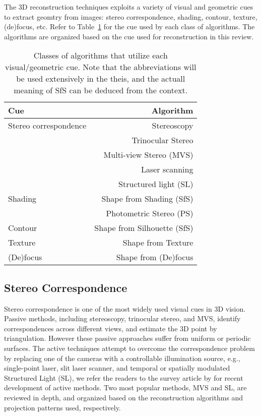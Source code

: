 The 3D reconstruction techniques exploits a variety of visual and geometric cues to extract geomtry from images: stereo correspondence, shading, contour, texture, (de)focus, etc. Refer to Table~\ref{tab:cue_algo} for the cue used by each class of algorithms. The algorithms are organized based on the cue used for reconstruction in this review.
\begin{table}[h]
  \centering
  \begin{tabular}{l|r}
  \hline
  \textbf{Cue} & \textbf{Algorithm}\\
  \hline\hline
  Stereo correspondence & Stereoscopy\\
  & Trinocular Stereo\\
  & Multi-view Stereo (MVS)\\
  & Laser scanning\\
  & Structured light (SL)\\
  \hline
  Shading & Shape from Shading (SfS)\\
  & Photometric Stereo (PS)\\
  \hline
  Contour & Shape from Silhouette (SfS)\\
  \hline
  Texture & Shape from Texture\\
  \hline
  (De)focus & Shape from (De)focus\\
  \hline
  \end{tabular}
  \caption{Classes of algorithms that utilize each visual/geometric cue. Note that the abbreviations will be used extensively in the theis, and the actuall meaning of SfS can be deduced from the context.}
  \label{tab:cue_algo}
\end{table}

\subsection{Stereo Correspondence}
Stereo correspondence is one of the most widely used visual cues in 3D vision. Passive methods, including stereoscopy, trinocular stereo, and MVS, identify correspondences across different views, and estimate the 3D point by triangulation. However these passive approaches suffer from uniform or periodic surfaces. The active techniques attempt to overcome the correspondence problem by replacing one of the cameras with a controllable illumination source, e.g., single-point laser, slit laser scanner, and temporal or spatially modulated Structured Light (SL), we refer the readers to the survey article by \citeauthor{blais2004review} for recent development of active methods. Two most popular methods, MVS and SL, are reviewed in depth, and organized based on the reconstruction algorithms and projection patterns used, respectively.

